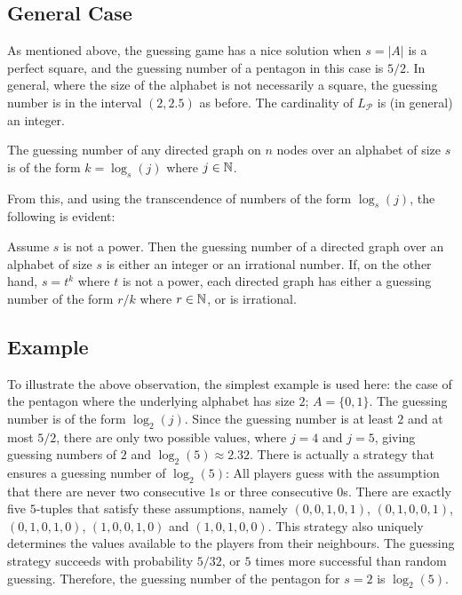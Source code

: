 \subsection{General Case}

As mentioned above, the guessing game has a nice solution when $s = |A|$ is a perfect square, and the guessing number of a pentagon in this case is $5/2$. In general, where the size of the alphabet is not necessarily a square, the guessing number is in the interval $(2, 2.5)$ as before. The cardinality of $L_\mathcal{P}$ is (in general) an integer.

\begin{observation}
	The guessing number of any directed graph on $n$ nodes over an alphabet of size $s$ is of the form $k = \log_s(j)$ where $j \in \mathbb{N}$.
\end{observation}

From this, and using the transcendence of numbers of the form $\log_s(j)$, the following is evident:

\begin{corollary}
	Assume $s$ is not a power. Then the guessing number of a directed graph over an alphabet of size $s$ is either an integer or an irrational number. If, on the other hand, $s = t^k$ where $t$ is not a power, each directed graph has either a guessing number of the form $r/k$ where $r \in \mathbb{N}$, or is irrational.
\end{corollary}

\subsection{Example}

To illustrate the above observation, the simplest example is used here: the case of the pentagon where the underlying alphabet has size $2$; $A = \{0, 1\}$. The guessing number is of the form $\log_2(j)$. Since the guessing number is at least $2$ and at most $5/2$, there are only two possible values, where $j = 4$ and $j = 5$, giving guessing numbers of $2$ and $\log_2(5) \approx 2.32$. There is actually a strategy that ensures a guessing number of $\log_2(5)$: All players guess with the assumption that there are never two consecutive $1$s or three consecutive $0$s. There are exactly five $5$-tuples that satisfy these assumptions, namely $(0, 0, 1, 0, 1)$, $(0, 1, 0, 0, 1)$, $(0, 1, 0, 1, 0)$, $(1, 0, 0, 1, 0)$ and $(1, 0, 1, 0, 0)$. This strategy also uniquely determines the values available to the players from their neighbours. The guessing strategy succeeds with probability $5/32$, or $5$ times more successful than random guessing. Therefore, the guessing number of the pentagon for $s = 2$ is $\log_2(5)$.


